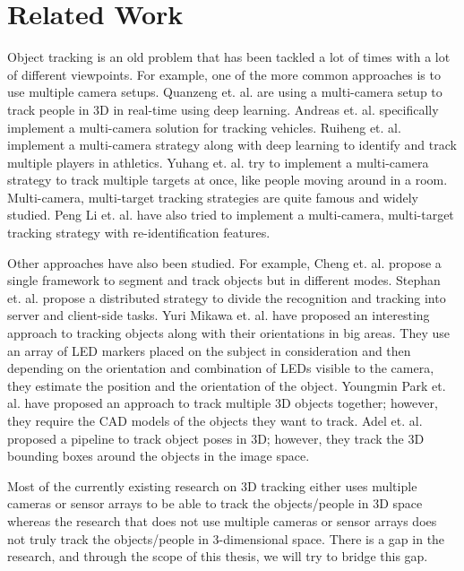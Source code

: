 \chapter{Related Work}

Object tracking is an old problem that has been tackled a lot of times with a lot of different viewpoints. For example, one of the more common approaches is to use multiple camera setups. Quanzeng et. al. \cite{1} are using a multi-camera setup to track people in 3D in real-time using deep learning. Andreas et. al. \cite{2} specifically implement a multi-camera solution for tracking vehicles. Ruiheng et. al. \cite{3}  implement a multi-camera strategy along with deep learning to identify and track multiple players in athletics. Yuhang et. al. \cite{4} try to implement a multi-camera strategy to track multiple targets at once, like people moving around in a room. Multi-camera, multi-target tracking strategies are quite famous and widely studied. Peng Li et. al. \cite{5} have also tried to implement a multi-camera, multi-target tracking strategy with re-identification features.\newline

Other approaches have also been studied. For example, Cheng et. al. \cite{6} propose a single framework to segment and track objects but in different modes. Stephan et. al. \cite{7} propose a distributed strategy to divide the recognition and tracking into server and client-side tasks. Yuri Mikawa et. al. \cite{8} have proposed an interesting approach to tracking objects along with their orientations in big areas. They use an array of LED markers placed on the subject in consideration and then depending on the orientation and combination of LEDs visible to the camera, they estimate the position and the orientation of the object. Youngmin Park et. al. \cite{9} have proposed an approach to track multiple 3D objects together; however, they require the CAD models of the objects they want to track. Adel et. al. \cite{10} proposed a pipeline to track object poses in 3D; however, they track the 3D  bounding boxes around the objects in the image space.\newline

Most of the currently existing research on 3D tracking either uses multiple cameras or sensor arrays to be able to track the objects/people in 3D space whereas the research that does not use multiple cameras or sensor arrays does not truly track the objects/people in 3-dimensional space. There is a gap in the research, and through the scope of this thesis, we will try to bridge this gap. 
